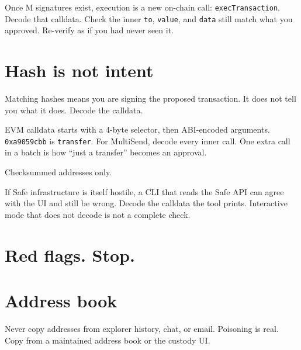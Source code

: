 Once M signatures exist, execution is a new
on-chain call: \texttt{execTransaction}. Decode
that calldata. Check the inner \texttt{to},
\texttt{value}, and \texttt{data} still match what
you approved. Re-verify as if you had never seen
it.

\section{Hash is not intent}

Matching hashes means you are signing the proposed
transaction. It does not tell you what it does.
Decode the calldata.

EVM calldata starts with a 4-byte selector, then
ABI-encoded arguments. \texttt{0xa9059cbb} is
\texttt{transfer}. For MultiSend, decode every
inner call. One extra call in a batch is how
``just a transfer'' becomes an approval.

Checksummed addresses only.

If Safe infrastructure is itself hostile, a CLI
that reads the Safe API can agree with the UI and
still be wrong. Decode the calldata the tool
prints. Interactive mode that does not decode is
not a complete check.

\section{Red flags. Stop.}


\section{Address book}

Never copy addresses from explorer history, chat,
or email. Poisoning is real. Copy from a maintained
address book or the custody UI.

